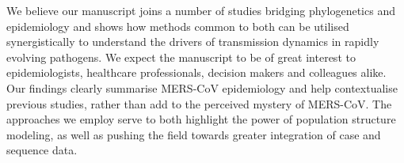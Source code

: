 \documentclass[stdletter,letterpaper,addrfromright,orderfromdateto,dateleft,11pt,noaddrto,sigleft]{newlfm}
\begin{document}
\begin{newlfm}
We believe our manuscript joins a number of studies bridging phylogenetics and epidemiology and shows how methods common to both can be utilised synergistically to understand the drivers of transmission dynamics in rapidly evolving pathogens.
We expect the manuscript to be of great interest to epidemiologists, healthcare professionals, decision makers and colleagues alike.
Our findings clearly summarise MERS-CoV epidemiology and help contextualise previous studies, rather than add to the perceived mystery of MERS-CoV.
The approaches we employ serve to both highlight the power of population structure modeling, as well as pushing the field towards greater integration of case and sequence data.

\end{newlfm}
\end{document}
